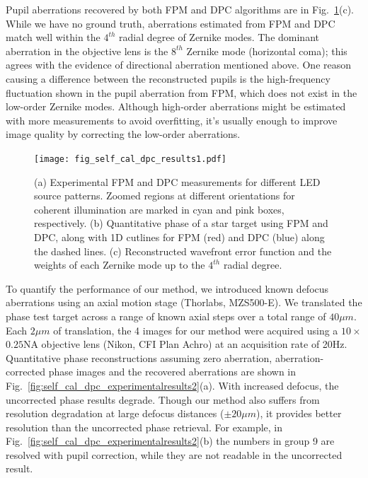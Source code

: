 Pupil aberrations recovered by both FPM and DPC algorithms are in Fig.~\ref{fig:self_cal_dpc_experimentalresults1}(c). While we have no ground truth, aberrations estimated from FPM and DPC match well within the $4^{th}$ radial degree of Zernike modes. The dominant aberration in the objective lens is the $8^{th}$ Zernike mode (horizontal coma); this agrees with the evidence of directional aberration mentioned above. One reason causing a difference between the reconstructed pupils is the high-frequency fluctuation shown in the pupil aberration from FPM, which does not exist in the low-order Zernike modes. Although high-order aberrations might be estimated with more measurements to avoid overfitting, it's usually enough to improve image quality by correcting the low-order aberrations.

\begin{figure}[ht!]
\centering\texttt{[image: fig\_self\_cal\_dpc\_results1.pdf]}
\caption{\label{fig:self_cal_dpc_experimentalresults1} (a) Experimental FPM and DPC measurements for different LED source patterns. Zoomed regions at different orientations for coherent illumination are marked in cyan and pink boxes, respectively. (b) Quantitative phase of a star target using FPM and DPC, along with 1D cutlines for FPM (red) and DPC (blue) along the dashed lines. (c) Reconstructed wavefront error function and the weights of each Zernike mode up to the $4^{th}$ radial degree.}
\end{figure}

To quantify the performance of our method, we introduced known defocus aberrations using an axial motion stage (Thorlabs, MZS500-E). We translated the phase test target across a range of known axial steps over a total range of $40 \mu m$. Each $2 \mu m$ of translation, the 4 images for our method were acquired using a $10\times$ $0.25 \mathrm{NA}$ objective lens (Nikon, CFI Plan Achro) at an acquisition rate of 20Hz. Quantitative phase reconstructions assuming zero aberration, aberration-corrected phase images and the recovered aberrations are shown in Fig.~\ref{fig:self_cal_dpc_experimentalresults2}(a). With increased defocus, the uncorrected phase results degrade. Though our method also suffers from resolution degradation at large defocus distances ($\pm 20\mu m$), it provides better resolution than the uncorrected phase retrieval. For example, in Fig.~\ref{fig:self_cal_dpc_experimentalresults2}(b) the numbers in group 9 are resolved with pupil correction, while they are not readable in the uncorrected result.

